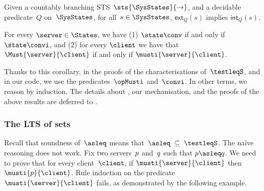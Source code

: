 \begin{proposition}%
  Given a countably branching STS~$\sts{\SysStates}{\to}$, and a decidable predicate~$Q$
  on~$\SysStates$, for all~$s \in \SysStates$, $\mathsf{ext}_Q(s)$ implies
  $\mathsf{int}_Q(s).$
\end{proposition}

\begin{corollary}
  \label{cor:ext-int-eq-conv}
  \label{cor:ext-int-eq-must}
  For every $\server \in \States$,
  we have (1) $\state \conv $ if and only if $\state \convi$,
  and (2) for every $\client$ we have that $\Must{\server}{\client}$ if
    and only if $\musti{\server}{\client}$.
\end{corollary}

\noindent
Thanks to this corollary, in the proofs of the characterisations of~$\testleqS$,
and in our code, we use the predicates~$\opMusti$ and~$\convi$. In other terms,
we reason by induction.
%
The details about \barinduction, our mechanisation,
and the proofs of the above results are deferred to .

\subsubsection{The LTS of sets}

Recall that soundness of~$\asleq$ means that~$\asleq \;\subseteq\; \testleqS$. 
%
The naïve reasoning does not work. Fix two servers~$p$ and~$q$
such that $\serverA \asleq \serverB$. We need to prove that for every
client~$\client$, if $\musti{\server}{\client}$ then
$\musti{\serverA}{\client}$.
%
Rule induction on the predicate $\musti{\server}{\client}$ fails, as
demonstrated by the following example.

